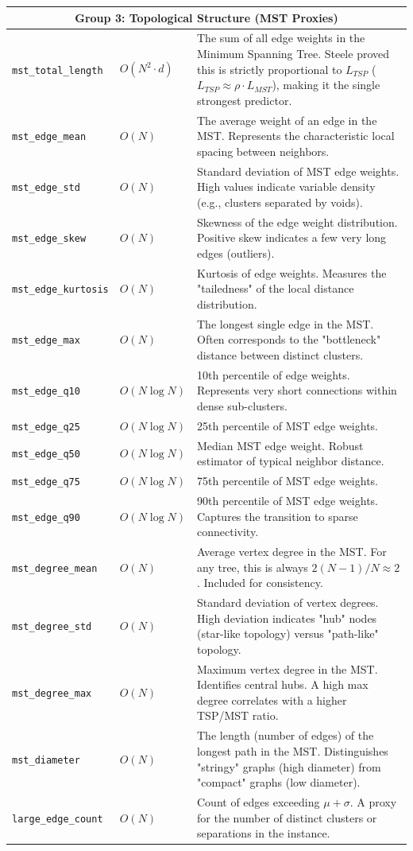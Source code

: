 \documentclass{article}
\begin{document}
\begin{longtable}{p{4cm} p{2.5cm} p{8.5cm}}
\multicolumn{3}{c}{\textbf{Group 3: Topological Structure (MST Proxies)}} \\
\midrule
\texttt{mst\_total\_length} & $O(N^2 \cdot d)$ & The sum of all edge weights in the Minimum Spanning Tree. Steele \cite{steele1987} proved this is strictly proportional to $L_{TSP}$ ($L_{TSP} \approx \rho \cdot L_{MST}$), making it the single strongest predictor. \\
\texttt{mst\_edge\_mean} & $O(N)$ & The average weight of an edge in the MST. Represents the characteristic local spacing between neighbors. \\
\texttt{mst\_edge\_std} & $O(N)$ & Standard deviation of MST edge weights. High values indicate variable density (e.g., clusters separated by voids). \\
\texttt{mst\_edge\_skew} & $O(N)$ & Skewness of the edge weight distribution. Positive skew indicates a few very long edges (outliers). \\
\texttt{mst\_edge\_kurtosis} & $O(N)$ & Kurtosis of edge weights. Measures the "tailedness" of the local distance distribution. \\
\texttt{mst\_edge\_max} & $O(N)$ & The longest single edge in the MST. Often corresponds to the "bottleneck" distance between distinct clusters. \\
\texttt{mst\_edge\_q10} & $O(N \log N)$ & 10th percentile of edge weights. Represents very short connections within dense sub-clusters. \\
\texttt{mst\_edge\_q25} & $O(N \log N)$ & 25th percentile of MST edge weights. \\
\texttt{mst\_edge\_q50} & $O(N \log N)$ & Median MST edge weight. Robust estimator of typical neighbor distance. \\
\texttt{mst\_edge\_q75} & $O(N \log N)$ & 75th percentile of MST edge weights. \\
\texttt{mst\_edge\_q90} & $O(N \log N)$ & 90th percentile of MST edge weights. Captures the transition to sparse connectivity. \\
\texttt{mst\_degree\_mean} & $O(N)$ & Average vertex degree in the MST. For any tree, this is always $2(N-1)/N \approx 2$. Included for consistency. \\
\texttt{mst\_degree\_std} & $O(N)$ & Standard deviation of vertex degrees. High deviation indicates "hub" nodes (star-like topology) versus "path-like" topology. \\
\texttt{mst\_degree\_max} & $O(N)$ & Maximum vertex degree in the MST. Identifies central hubs. A high max degree correlates with a higher TSP/MST ratio. \\
\texttt{mst\_diameter} & $O(N)$ & The length (number of edges) of the longest path in the MST. Distinguishes "stringy" graphs (high diameter) from "compact" graphs (low diameter). \\
\texttt{large\_edge\_count} & $O(N)$ & Count of edges exceeding $\mu + \sigma$. A proxy for the number of distinct clusters or separations in the instance. \\
\bottomrule
\end{longtable}
\end{document}
